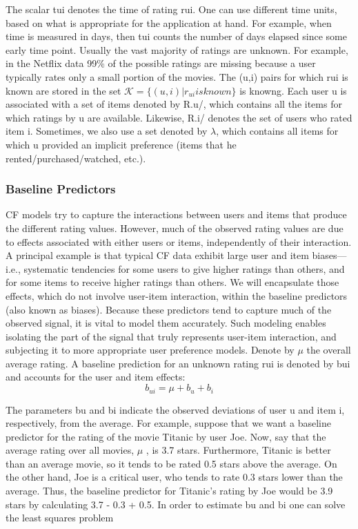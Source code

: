 The scalar tui denotes the time of rating rui. One can use different time units, based on what is appropriate for the application at hand. For example, when time is measured in days, then tui counts the number of days elapsed since some early time point. Usually the vast majority of ratings are unknown. For example, in the Netflix data 99\% of the possible ratings are missing because a user typically rates only a small portion of the movies. The (u,i) pairs for which rui is known are stored in the set $ \mathcal { K } = \{ ( u , i ) | r _ { u i } is known \} $ is knowng. Each user u is associated with a set of items denoted by R.u/, which contains all the items for which ratings by u are available. Likewise, R.i/ denotes the set of users who rated item i. Sometimes, we also use a set denoted by $\lambda$, which contains all items for which u provided an implicit preference (items that he rented/purchased/watched, etc.).

\subsubsection{Baseline Predictors}

CF models try to capture the interactions between users and items that produce the different rating values. However, much of the observed rating values are due to effects associated with either users or items, independently of their interaction. A principal example is that typical CF data exhibit large user and item biases—i.e., systematic tendencies for some users to give higher ratings than others, and for some items to receive higher ratings than others.
We will encapsulate those effects, which do not involve user-item interaction, within the baseline predictors (also known as biases). Because these predictors tend to capture much of the observed signal, it is vital to model them accurately. Such modeling enables isolating the part of the signal that truly represents user-item interaction, and subjecting it to more appropriate user preference models.
Denote by $\mu$ the overall average rating. A baseline prediction for an unknown rating rui is denoted by bui and accounts for the user and item effects:
$$
b _ { u i } = \mu + b _ { u } + b _ { i }
$$

The parameters bu and bi indicate the observed deviations of user u and item i, respectively, from the average. For example, suppose that we want a baseline predictor for the rating of the movie Titanic by user Joe. Now, say that the average rating over all movies, $\mu$ , is 3.7 stars. Furthermore, Titanic is better than an average movie, so it tends to be rated 0.5 stars above the average. On the other hand, Joe is a critical user, who tends to rate 0.3 stars lower than the average. Thus, the baseline predictor for Titanic’s rating by Joe would be 3.9 stars by calculating 3.7 - 0.3 + 0.5. In order to estimate bu and bi one can solve the least squares problem

